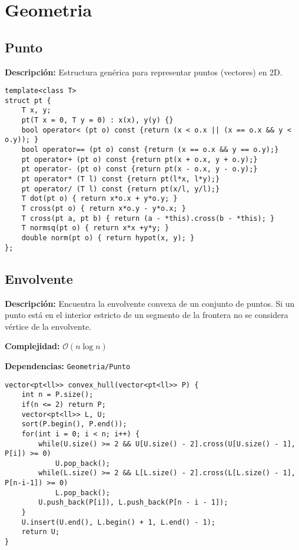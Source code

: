 \documentclass[twocolumn]{article}
\begin{document}
\section{Geometria}
\subsection{Punto}
\begin{footnotesize}{\bf Descripción: } Estructura genérica para representar puntos (vectores) en 2D.
\end{footnotesize}\lstset{basicstyle=\footnotesize\ttfamily,breaklines=true,tabsize=2,language=C++,frame=leftline, numbers=left, numberstyle=\tiny, numbersep=5pt}
\begin{lstlisting}
template<class T>
struct pt {
	T x, y;
	pt(T x = 0, T y = 0) : x(x), y(y) {}
	bool operator< (pt o) const {return (x < o.x || (x == o.x && y < o.y)); }
	bool operator== (pt o) const {return (x == o.x && y == o.y);}
	pt operator+ (pt o) const {return pt(x + o.x, y + o.y);}
	pt operator- (pt o) const {return pt(x - o.x, y - o.y);}
	pt operator* (T l) const {return pt(l*x, l*y);}
	pt operator/ (T l) const {return pt(x/l, y/l);}
	T dot(pt o) { return x*o.x + y*o.y; }
	T cross(pt o) { return x*o.y - y*o.x; }
	T cross(pt a, pt b) { return (a - *this).cross(b - *this); }
	T normsq(pt o) { return x*x +y*y; }
	double norm(pt o) { return hypot(x, y); }
};
\end{lstlisting}
\subsection{Envolvente}
\begin{footnotesize}{\bf Descripción: } Encuentra la envolvente convexa de un conjunto de puntos. Si un punto está en el interior estricto de un segmento de la frontera no se considera vértice de la envolvente.


{\bf Complejidad: } $\mathcal{O}(n \log n)$


{\bf Dependencias: } \texttt{Geometria/Punto}
\end{footnotesize}\lstset{basicstyle=\footnotesize\ttfamily,breaklines=true,tabsize=2,language=C++,frame=leftline, numbers=left, numberstyle=\tiny, numbersep=5pt}
\begin{lstlisting}
vector<pt<ll>> convex_hull(vector<pt<ll>> P) {
	int n = P.size();
	if(n <= 2) return P;
	vector<pt<ll>> L, U;
	sort(P.begin(), P.end());
	for(int i = 0; i < n; i++) {
		while(U.size() >= 2 && U[U.size() - 2].cross(U[U.size() - 1], P[i]) >= 0)
			U.pop_back();
		while(L.size() >= 2 && L[L.size() - 2].cross(L[L.size() - 1], P[n-i-1]) >= 0)
			L.pop_back();
		U.push_back(P[i]), L.push_back(P[n - i - 1]);
	}
	U.insert(U.end(), L.begin() + 1, L.end() - 1);
	return U;
}
\end{lstlisting}
\end{document}
